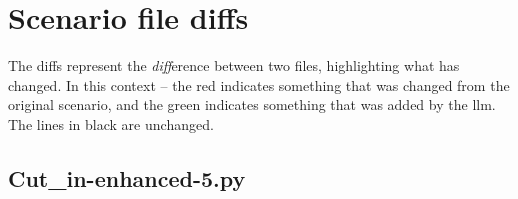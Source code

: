 \chapter{Scenario file diffs}\label{sec:fileDiffs}

The diffs represent the \emph{diff}erence between two files, highlighting what
has changed. In this context -- the red indicates something that was changed
from the original scenario, and the green indicates something that was added by
the \acrshort{llm}. The lines in black are unchanged.

\section{Cut\_in-enhanced-5.py }


